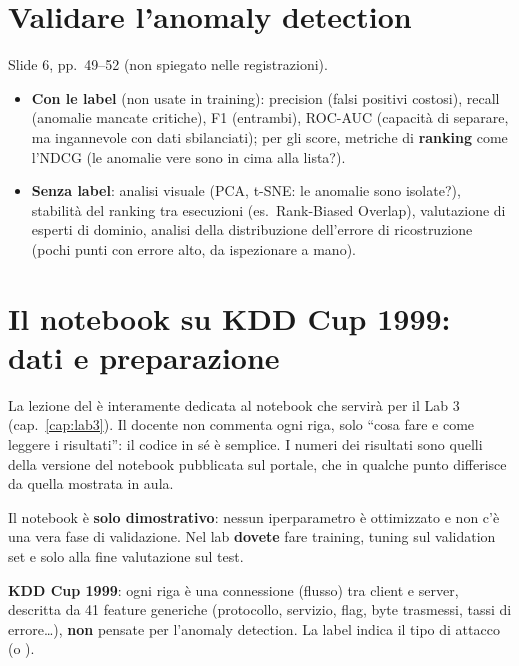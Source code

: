\section{Validare l'anomaly detection}
Slide 6, pp.\ 49--52 (non spiegato nelle registrazioni).
\begin{itemize}
  \item \textbf{Con le label} (non usate in training): precision (falsi positivi costosi), recall (anomalie mancate critiche), F1 (entrambi),
        ROC-AUC (capacità di separare, ma ingannevole con dati sbilanciati); per gli score, metriche di \textbf{ranking} come l'NDCG (le anomalie
        vere sono in cima alla lista?).
  \item \textbf{Senza label}: analisi visuale (PCA, t-SNE: le anomalie sono isolate?), stabilità del ranking tra esecuzioni (es.\ Rank-Biased
        Overlap), valutazione di esperti di dominio, analisi della distribuzione dell'errore di ricostruzione (pochi punti con errore alto, da
        ispezionare a mano).
\end{itemize}

\section{Il notebook su KDD Cup 1999: dati e preparazione}
La lezione del  è interamente dedicata al notebook che servirà per il Lab 3 (cap.~\ref{cap:lab3}). Il docente non
commenta ogni riga, solo ``cosa fare e come leggere i risultati'': il codice in sé è semplice. I numeri dei risultati sono quelli della
versione del notebook pubblicata sul portale, che in qualche punto differisce da quella mostrata in aula.

\begin{esame}
Il notebook è \textbf{solo dimostrativo}: nessun iperparametro è ottimizzato e non c'è una vera fase di validazione. Nel lab
\textbf{dovete} fare training, tuning sul validation set e solo alla fine valutazione sul test.
\end{esame}

\textbf{KDD Cup 1999}: ogni riga è una connessione (flusso) tra client e server, descritta da 41 feature generiche (protocollo,
servizio, flag, byte trasmessi, tassi di errore\ldots), \textbf{non} pensate per l'anomaly detection. La label indica il tipo di
attacco (o ).

